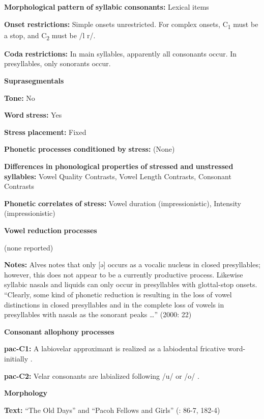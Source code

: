 \begin{styleBody}
\textbf{Morphological} \textbf{pattern} \textbf{of} \textbf{syllabic} \textbf{consonants:} Lexical items

\textbf{Onset} \textbf{restrictions:} Simple onsets unrestricted. For complex onsets, C\textsubscript{1} must be a stop, and C\textsubscript{2} must be /l r/. 

\textbf{Coda} \textbf{restrictions:} In main syllables, apparently all consonants occur. In presyllables, only sonorants occur.

\textbf{Suprasegmentals}

\textbf{Tone:} No

\textbf{Word} \textbf{stress:} Yes

\textbf{Stress} \textbf{placement:} Fixed

\textbf{Phonetic} \textbf{processes} \textbf{conditioned} \textbf{by} \textbf{stress:} (None)

\textbf{Differences} \textbf{in} \textbf{phonological} \textbf{properties} \textbf{of} \textbf{stressed} \textbf{and} \textbf{unstressed} \textbf{syllables:} Vowel Quality Contrasts, Vowel Length Contrasts, Consonant Contrasts

\textbf{Phonetic} \textbf{correlates} \textbf{of} \textbf{stress:} Vowel duration (impressionistic), Intensity (impressionistic)

\textbf{Vowel} \textbf{reduction} \textbf{processes}

(none reported)

\textbf{Notes:} Alves notes that only [ə] occurs as a vocalic nucleus in closed presyllables; however, this does not appear to be a currently productive process. Likewise syllabic nasals and liquids can only occur in presyllables with glottal-stop onsets. “Clearly, some kind of phonetic reduction is resulting in the loss of vowel distinctions in closed presyllables and in the complete loss of vowels in presyllables with nasals as the sonorant peaks …” (2000: 22)

\textbf{Consonant} \textbf{allophony} \textbf{processes}

\textbf{pac-C1:} A labiovelar approximant is realized as a labiodental fricative word-initially \citep[11]{Alves2006}.

\textbf{pac-C2:} Velar consonants are labialized following /u/ or /o/ \citep[12]{Alves2006}.

\textbf{Morphology}

\textbf{Text:} “The Old Days” and “Pacoh Fellows and Girls” (\citealt{Watson1980}: 86-7, 182-4)


\end{styleBody}
